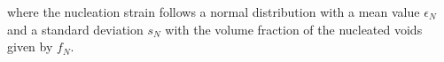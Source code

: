 where the nucleation strain follows a normal distribution with a mean value $\epsilon_N$ and a standard deviation $s_N$ with the volume fraction of the nucleated voids given by $f_N$.


